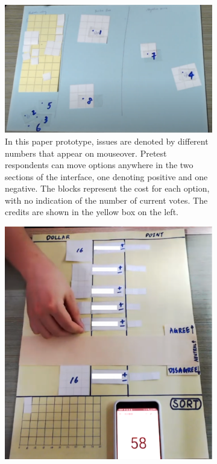 \begin{figure}[H]
    \centering
    \begin{subfigure}[b]{0.54\textwidth}
        \centering
        \includegraphics[width=\textwidth]{content/image/prototypes/1.2_paper_qv_single.png}
        \caption{In this paper prototype, issues are denoted by different numbers that appear on mouseover. Pretest respondents can move options anywhere in the two sections of the interface, one denoting positive and one negative. The blocks represent the cost for each option, with no indication of the number of current votes. The credits are shown in the yellow box on the left.}
        \label{fig:horizontal_paper}
    \end{subfigure}
    \hfill
    \begin{subfigure}[b]{0.42\textwidth}
        \centering
        \includegraphics[width=\textwidth]{content/image/prototypes/1_paper_qv_single.png}

\end{subfigure}
\end{figure}
